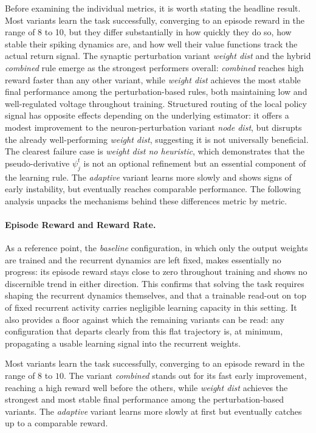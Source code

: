 Before examining the individual metrics, it is worth stating the headline
result. Most variants learn the task successfully, converging to an episode
reward in the range of 8 to 10, but they differ substantially in how
quickly they do so, how stable their spiking dynamics are, and how well
their value functions track the actual return signal. The synaptic
perturbation variant \emph{weight dist} and the hybrid \emph{combined}
rule emerge as the strongest performers overall: \emph{combined} reaches
high reward faster than any other variant, while \emph{weight dist}
achieves the most stable final performance among the perturbation-based
rules, both maintaining low and well-regulated voltage throughout training.
Structured routing of the local policy signal has opposite effects depending
on the underlying estimator: it offers a modest improvement to the
neuron-perturbation variant \emph{node dist}, but disrupts the already
well-performing \emph{weight dist}, suggesting it is not universally
beneficial. The clearest failure case is \emph{weight dist no heuristic},
which demonstrates that the pseudo-derivative $\psi^t_j$ is not an optional
refinement but an essential component of the learning rule. The
\emph{adaptive} variant learns more slowly and shows signs of early
instability, but eventually reaches comparable performance. The following
analysis unpacks the mechanisms behind these differences metric by metric.

\paragraph{Episode Reward and Reward Rate.}

As a reference point, the \emph{baseline} configuration, in which only the output weights
are trained and the recurrent dynamics are left fixed, makes essentially no progress: its
episode reward stays close to zero throughout training and shows no discernible trend in
either direction. This confirms that solving the task requires shaping the recurrent dynamics
themselves, and that a trainable read-out on top of fixed recurrent activity carries
negligible learning capacity in this setting. It also provides a floor against which the
remaining variants can be read: any configuration that departs clearly from this flat
trajectory is, at minimum, propagating a usable learning signal into the recurrent weights.

Most variants learn the task successfully, converging to an episode reward in the range of
$8$ to $10$. The variant \emph{combined} stands out for its fast early improvement, reaching a
high reward well before the others, while \emph{weight dist} achieves the strongest
and most stable final performance among the perturbation-based variants. The \emph{adaptive} variant learns more slowly at first but eventually catches up to a comparable reward.

